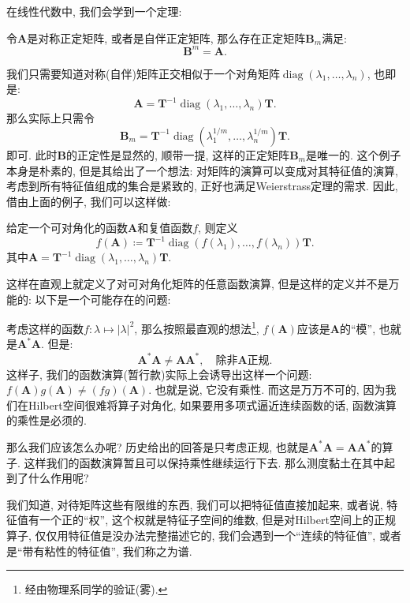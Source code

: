 \documentclass{MeasureClay}
\makeatletter
\renewenvironment{proof}[1][\proofname]{\par
\pushQED{\qed}%
\small\normalfont \topsep6\p@\@plus6\p@\relax
\trivlist%
\item\relax%
{\itshape%
#1\@addpunct{.}}\hspace\labelsep\ignorespaces
}{%
\popQED\endtrivlist\@endpefalse
}
\makeatother
\begin{document}
在线性代数中, 我们会学到一个定理:
\begin{theorem}[自伴矩阵的平方根]
    令$\bm A$是对称正定矩阵, 或者是自伴正定矩阵, 那么存在正定矩阵$\bm B_m$满足:
    \[\bm B^m = \bm A.\]
\end{theorem}
\begin{proof}
    我们只需要知道对称(自伴)矩阵正交相似于一个对角矩阵$\operatorname{diag}(\lambda _1, \dots ,\lambda _n)$, 也即是:
    \[\bm A = \bm T^{-1} \operatorname{diag}(\lambda _1, \dots ,\lambda _n)\bm T.\]
    那么实际上只需令
    \[\bm B_m = \bm T^{-1} \operatorname{diag}(\lambda_1^{1 / m}, \dots ,\lambda _n^{1 / m})\bm T.\]
    即可. 此时$\bm B$的正定性是显然的, 顺带一提, 这样的正定矩阵$\bm B_m$是唯一的.
\end{proof}
这个例子本身是朴素的, 但是其给出了一个想法: 对矩阵的演算可以变成对其特征值的演算, 考虑到所有特征值组成的集合是紧致的, 正好也满足Weierstrass定理的需求. 因此, 借由上面的例子, 我们可以这样做:
\begin{defi}
    给定一个可对角化的函数$\bm A$和复值函数$f$, 则定义
    \[f(\bm A)\coloneqq \bm T^{-1} \operatorname{diag}(f(\lambda_1), \dots ,f(\lambda_n))\bm T.\]
    其中$\bm A = \bm T^{-1} \operatorname{diag}(\lambda _1, \dots ,\lambda _n)\bm T$.
\end{defi}
这样在直观上就定义了对可对角化矩阵的任意函数演算, 但是这样的定义并不是万能的: 以下是一个可能存在的问题:
\begin{example}[坏例子]
    考虑这样的函数$f\colon \lambda \mapsto |\lambda |^2$, 那么按照最直观的想法\footnote{经由物理系同学的验证(雾).}, $f(\bm A)$应该是$\bm A$的``模'', 也就是$\bm A^*\bm A$. 但是:
    \[\bm A^*\bm A \neq  \bm A\bm A^*,\quad \text{除非\(\bm A\)正规}.\]
    这样子, 我们的函数演算(暂行款)实际上会诱导出这样一个问题: $f(\bm A)g(\bm A)\neq (fg)(\bm A)$. 也就是说, 它没有乘性. 而这是万万不可的, 因为我们在Hilbert空间很难将算子对角化, 如果要用多项式逼近连续函数的话, 函数演算的乘性是必须的.
\end{example}
那么我们应该怎么办呢? 历史给出的回答是只考虑正规, 也就是$\bm A^*\bm A =  \bm A\bm A^*$的算子. 这样我们的函数演算暂且可以保持乘性继续运行下去. 那么测度黏土在其中起到了什么作用呢?

我们知道, 对待矩阵这些有限维的东西, 我们可以把特征值直接加起来, 或者说, 特征值有一个正的``权'', 这个权就是特征子空间的维数, 但是对Hilbert空间上的正规算子, 仅仅用特征值是没办法完整描述它的, 我们会遇到一个``连续的特征值'', 或者是``带有粘性的特征值'', 我们称之为谱.
\end{document}
